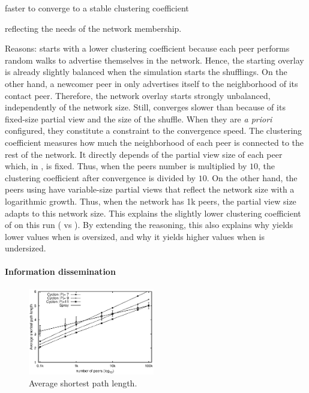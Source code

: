 \begin{asparadesc}
\begin{inparaenum}
  \item faster to converge to a stable clustering coefficient
  \item reflecting the needs of the network membership.
  \end{inparaenum}
\item[Reasons:] \CYCLON starts with a lower clustering coefficient because each
  peer performs random walks to advertise themselves in the network. Hence, the
  starting overlay is already slightly balanced when the simulation starts the
  shufflings. On the other hand, a newcomer peer in \SPRAY only advertises
  itself to the neighborhood of its contact peer. Therefore, the network overlay
  starts strongly unbalanced, independently of the network size. Still, \CYCLON
  converges slower than \SPRAY because of its fixed-size partial view and the
  size of the shuffle. When they are \emph{a priori} configured, they constitute
  a constraint to the convergence speed.  The clustering coefficient measures
  how much the neighborhood of each peer is connected to the rest of the
  network. It directly depends of the partial view size of each peer which, in
  \CYCLON, is fixed. Thus, when the peers number is multiplied by $10$, the
  clustering coefficient after convergence is divided by $10$. On the other
  hand, the peers using \SPRAY have variable-size partial views that reflect the
  network size with a logarithmic growth. Thus, when the network has 1k peers,
  the partial view size adapts to this network size. This explains the slightly
  lower clustering coefficient of \SPRAY on this run ( vs ). By extending the reasoning, this also explains why \SPRAY yields lower
  values when \CYCLON is oversized, and why it yields higher values when \CYCLON
  is undersized.
\end{asparadesc}

\vspace{-7pt}
\paragraph{Information dissemination}

\begin{figure}
  \centering
  \includegraphics[width=0.49\textwidth]{img/avgpath.eps}
  \caption{\label{fig:avgpath}Average shortest path length.}
\end{figure}

